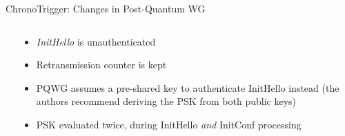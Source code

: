 \begin{frame}{ChronoTrigger: Changes in Post-Quantum WG}
  \begin{columns}[fullwidth,T]
    \begin{column}{.5\linewidth}
    \end{column}

    \begin{column}{.46\linewidth}
      \begin{itemize}
        \item \emph{InitHello} is unauthenticated
        \item Retransmission counter is kept
        \item PQWG assumes a pre-shared key to authenticate InitHello instead (the authors recommend deriving the PSK from both public keys)
        \item PSK evaluated twice, during InitHello \emph{and} InitConf processing
      \end{itemize}
    \end{column}
  \end{columns}
\end{frame}

